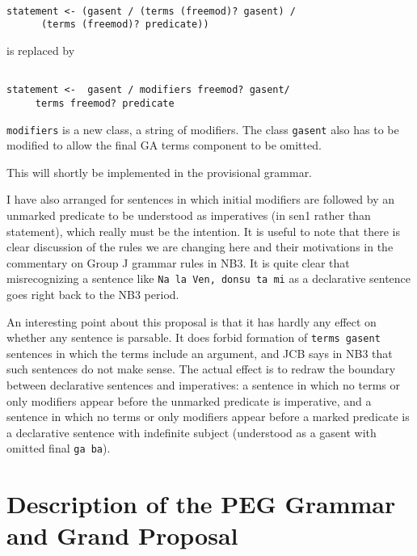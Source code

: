 \documentclass[12pt]{article}
\begin{document}
\begin{description}
\begin{verbatim}

statement <- (gasent / (terms (freemod)? gasent) /
      (terms (freemod)? predicate))

\end{verbatim}

is replaced by

\begin{verbatim}

statement <-  gasent / modifiers freemod? gasent/
     terms freemod? predicate

\end{verbatim}

{\tt modifiers} is a new class, a string of modifiers.  The class {\tt gasent} also has to be modified to allow the final GA terms component to be omitted.

This will shortly be implemented in the provisional grammar.

 I have also arranged for sentences in which initial modifiers are followed by an unmarked predicate to be understood as imperatives (in sen1 rather
than statement), which really must
be the intention.   It is useful to note that there is clear discussion of the rules we are changing here and their motivations in the commentary on Group J grammar rules
in NB3.  It is quite clear that misrecognizing a sentence like {\tt Na la Ven, donsu ta mi} as a declarative sentence goes right back to the NB3 period.

An interesting point about this proposal is that it has hardly any effect on whether any sentence is parsable.   It does forbid formation of {\tt terms gasent} sentences
in which the terms include an argument, and JCB says in NB3 that such sentences do not make sense.  The actual effect is to redraw the boundary between
declarative sentences and imperatives:  a sentence in which no terms or only modifiers appear before the unmarked predicate is imperative, and a sentence in which
no terms or only modifiers appear before a marked predicate is a declarative sentence with indefinite subject (understood as a gasent with omitted final {\tt ga ba}).

\end{description}

\newpage

\section{Description of the PEG Grammar and Grand Proposal}
\end{document}
